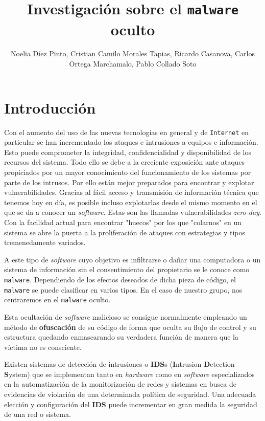 \documentclass[12pt]{article}
\title{Investigación sobre el \texttt{malware} oculto}
\author{Noelia Díez Pinto, Cristian Camilo Morales Tapias, Ricardo Casanova, Carlos Ortega Marchamalo, Pablo Collado Soto}
\date{}
\newcommand{\newpar} {
    \vskip 1cm
}
\begin{document}
    \begin{titlepage}
        \maketitle
    \end{titlepage}

    \newpage
    \tableofcontents

    \section{Introducción}
        Con el aumento del uso de las nuevas tecnologías en general y de \texttt{Internet} en particular se han incrementado los ataques e intrusiones a equipos e información. Esto puede comprometer la integridad, confidencialidad y disponibilidad de los recursos del sistema. Todo ello se debe a la creciente exposición ante ataques propiciados por un mayor conocimiento del funcionamiento de los sistemas por parte de los intrusos. Por ello están mejor preparados para encontrar y explotar vulnerabilidades. Gracias al fácil acceso y transmisión de información técnica que tenemos hoy en día, es posible incluso explotarlas desde el mismo momento en el que se da a conocer un \textit{software}. Estas son las llamadas vulnerabilidades \textit{zero-day}. Con la facilidad actual para encontrar "huecos" por los que "colarnos" en un sistema se abre la puerta a la proliferación de ataques con estrategias y tipos tremenedamente variados.

        \newpar

        A este tipo de \textit{software} cuyo objetivo es infiltrarse o dañar una computadora o un sistema de información sin el consentimiento del propietario se le conoce como 
        \texttt{malware}. Dependiendo de los efectos deseados de dicha pieza de código, el \texttt{malware} se puede clasificar en varios tipos. En el caso de nuestro grupo, nos centraremos en el \texttt{malware} oculto.

        \newpar

        Esta ocultación de \textit{software} malicioso se consigue normalmente empleando un método de \textbf{ofuscación} de su código de forma que oculta su flujo de control y su estructura quedando enmascarando su verdadera función de manera que la víctima no es consciente.

        \newpar

        Existen sistemas de detección de intrusiones o \textbf{IDS}s (\textbf{I}ntrusion \textbf{D}etection \textbf{S}ystem) que se implementan tanto en \textit{hardware} como en \textit{software} especializados en la automatización de la monitorización de redes y sistemas en busca de evidencias de violación de una determinada política de seguridad. Una adecuada elección y configuración del \textbf{IDS} puede incrementar en gran medida la seguridad de una red o sistema.
\end{document}
